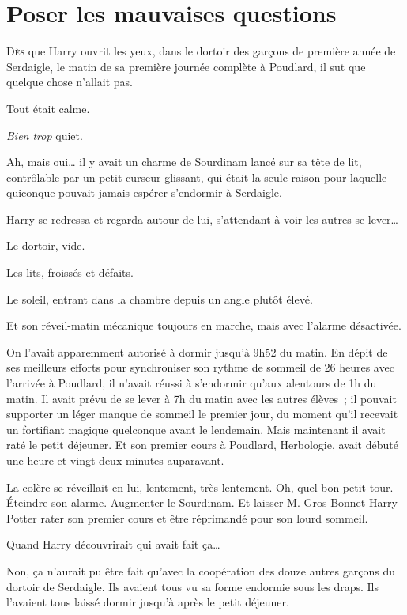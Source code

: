 \chapter{Poser les mauvaises questions}

\lettrine{D}{ès} que Harry ouvrit les yeux, dans le dortoir des garçons de première année de Serdaigle, le matin de sa première journée complète à Poudlard, il sut que quelque chose n'allait pas.

Tout était calme.

\emph{Bien trop} quiet.

Ah, mais oui… il y avait un charme de Sourdinam lancé sur sa tête de lit, contrôlable par un petit curseur glissant, qui était la seule raison pour laquelle quiconque pouvait jamais espérer s'endormir à Serdaigle.

Harry se redressa et regarda autour de lui, s'attendant à voir les autres se lever…

Le dortoir, vide.

Les lits, froissés et défaits.

Le soleil, entrant dans la chambre depuis un angle plutôt élevé.

Et son réveil-matin mécanique toujours en marche, mais avec l'alarme désactivée.

On l'avait apparemment autorisé à dormir jusqu'à 9h52 du matin. En dépit de ses meilleurs efforts pour synchroniser son rythme de sommeil de 26 heures avec l'arrivée à Poudlard, il n'avait réussi à s'endormir qu'aux alentours de 1h du matin. Il avait prévu de se lever à 7h du matin avec les autres élèves~; il pouvait supporter un léger manque de sommeil le premier jour, du moment qu'il recevait un fortifiant magique quelconque avant le lendemain. Mais maintenant il avait raté le petit déjeuner. Et son premier cours à Poudlard, Herbologie, avait débuté une heure et vingt-deux minutes auparavant.

La colère se réveillait en lui, lentement, très lentement. Oh, quel bon petit tour. Éteindre son alarme. Augmenter le Sourdinam. Et laisser M. Gros Bonnet Harry Potter rater son premier cours et être réprimandé pour son lourd sommeil.

Quand Harry découvrirait qui avait fait ça…

Non, ça n'aurait pu être fait qu'avec la coopération des douze autres garçons du dortoir de Serdaigle. Ils avaient tous vu sa forme endormie sous les draps. Ils l'avaient tous laissé dormir jusqu'à après le petit déjeuner.

